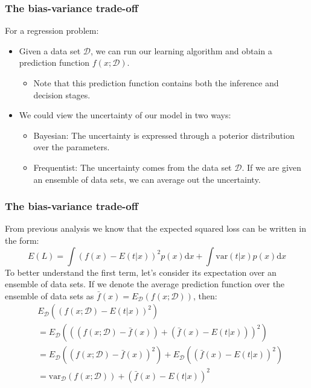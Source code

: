 \documentclass{beamer}
\begin{document}
\begin{frame}
    \frametitle{The bias-variance trade-off}
    For a regression problem:
    \begin{itemize}
        \item Given a data set $\mathcal{D}$, we can run our learning algorithm and obtain a prediction function $f(x;\mathcal{D})$.
        \begin{itemize}
            \item Note that this prediction function contains both the inference and decision stages.
        \end{itemize}
        \item We could view the uncertainty of our model in two ways:
        \begin{itemize}
            \item Bayesian: The uncertainty is expressed through a poterior distribution over the parameters.
            \item Frequentist: The uncertainty comes from the data set $\mathcal{D}$. If we are given an ensemble of data sets, we can average out the uncertainty.
        \end{itemize}
    \end{itemize}
\end{frame}

\begin{frame}
    \frametitle{The bias-variance trade-off}
    From previous analysis we know that the expected squared loss can be written in the form:
    \begin{equation*}
        E(L)=\int(f(x)-E(t|x))^{2}p(x)\mathrm{d}x+\int\mathrm{var}(t|x)p(x)\mathrm{d}x
    \end{equation*}
    To better understand the first term, let's consider its expectation over an ensemble of data sets. If we denote the average prediction function over the ensemble of data sets as $\bar{f}(x)=E_{\mathcal{D}}(f(x;\mathcal{D}))$, then:
    \begin{align*}
        &E_{\mathcal{D}}((f(x;\mathcal{D})-E(t|x))^{2}) \\
        &=E_{\mathcal{D}}(((f(x;\mathcal{D})-\bar{f}(x))+(\bar{f}(x)-E(t|x)))^{2}) \\
        &=E_{\mathcal{D}}((f(x;\mathcal{D})-\bar{f}(x))^{2})+E_{\mathcal{D}}((\bar{f}(x)-E(t|x))^{2}) \\
        &=\mathrm{var}_{\mathcal{D}}(f(x;\mathcal{D}))+(\bar{f}(x)-E(t|x))^{2}
    \end{align*}
\end{frame}
\end{document}
